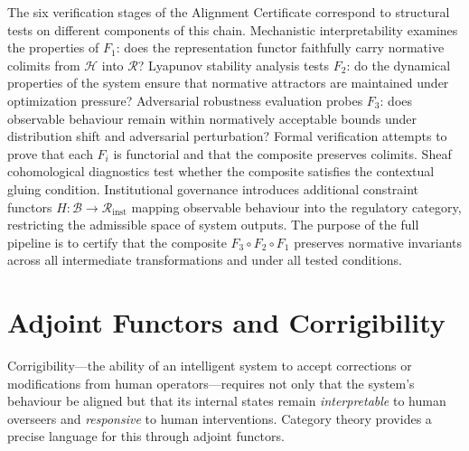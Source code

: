 \documentclass[12pt]{article}
\theoremstyle{definition}
\begin{document}
The six verification stages of the Alignment Certificate correspond to
structural tests on different components of this chain. Mechanistic
interpretability examines the properties of $F_1$: does the representation
functor faithfully carry normative colimits from $\mathcal{H}$ into
$\mathcal{R}$? Lyapunov stability analysis tests $F_2$: do the dynamical
properties of the system ensure that normative attractors are maintained under
optimization pressure? Adversarial robustness evaluation probes $F_3$: does
observable behaviour remain within normatively acceptable bounds under
distribution shift and adversarial perturbation? Formal verification attempts
to prove that each $F_i$ is functorial and that the composite preserves colimits.
Sheaf cohomological diagnostics test whether the composite satisfies the
contextual gluing condition. Institutional governance introduces additional
constraint functors $H : \mathcal{B} \to \mathcal{R}_{\mathrm{inst}}$ mapping
observable behaviour into the regulatory category, restricting the admissible
space of system outputs. The purpose of the full pipeline is to certify that
the composite $F_3 \circ F_2 \circ F_1$ preserves normative invariants across
all intermediate transformations and under all tested conditions.

\section{Adjoint Functors and Corrigibility}
\label{app:adjoint}

Corrigibility---the ability of an intelligent system to accept corrections or
modifications from human operators---requires not only that the system's
behaviour be aligned but that its internal states remain \emph{interpretable}
to human overseers and \emph{responsive} to human interventions. Category
theory provides a precise language for this through adjoint functors.
\end{document}
